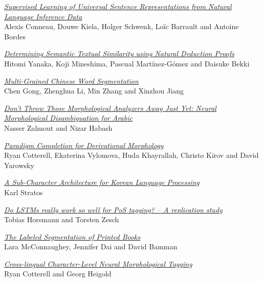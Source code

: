 \hyperlink{page.679}{\em Supervised Learning of Universal Sentence Representations from Natural Language Inference Data}\samepage \\
\hspace*{7mm} Alexis Conneau, Douwe Kiela, Holger Schwenk, Lo\"{i}c Barrault and Antoine Bordes\dotfill {}

\hyperlink{page.690}{\em Determining Semantic Textual Similarity using Natural Deduction Proofs}\samepage \\
\hspace*{7mm} Hitomi Yanaka, Koji Mineshima, Pascual Mart\'{i}nez-G\'{o}mez and Daisuke Bekki\dotfill {}

\hyperlink{page.701}{\em Multi-Grained Chinese Word Segmentation}\samepage \\
\hspace*{7mm} Chen Gong, Zhenghua Li, Min Zhang and Xinzhou Jiang\dotfill {}

\hyperlink{page.713}{\em Don't Throw Those Morphological Analyzers Away Just Yet: Neural Morphological Disambiguation for Arabic}\samepage \\
\hspace*{7mm} Nasser Zalmout and Nizar Habash\dotfill {}

\hyperlink{page.723}{\em Paradigm Completion for Derivational Morphology}\samepage \\
\hspace*{7mm} Ryan Cotterell, Ekaterina Vylomova, Huda Khayrallah, Christo Kirov and David Yarowsky\dotfill {}

\hyperlink{page.730}{\em A Sub-Character Architecture for Korean Language Processing}\samepage \\
\hspace*{7mm} Karl Stratos\dotfill {}

\hyperlink{page.736}{\em Do LSTMs really work so well for PoS tagging? -- A replication study}\samepage \\
\hspace*{7mm} Tobias Horsmann and Torsten Zesch\dotfill {}

\hyperlink{page.746}{\em The Labeled Segmentation of Printed Books}\samepage \\
\hspace*{7mm} Lara McConnaughey, Jennifer Dai and David Bamman\dotfill {}

\hyperlink{page.757}{\em Cross-lingual Character-Level Neural Morphological Tagging}\samepage \\
\hspace*{7mm} Ryan Cotterell and Georg Heigold\dotfill {}

